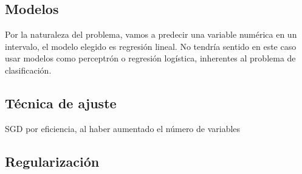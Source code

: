 \documentclass[a4paper, 20pt]{article}
\begin{document}
\subsection{Modelos}
Por la naturaleza del problema, vamos a predecir una variable numérica en un intervalo, el modelo elegido es regresión lineal. No tendría sentido en este caso usar modelos como perceptrón o regresión logística, inherentes al problema de clasificación.

\subsection{Técnica de ajuste}

SGD por eficiencia, al haber aumentado el número de variables

\subsection{Regularización}


\end{document}
